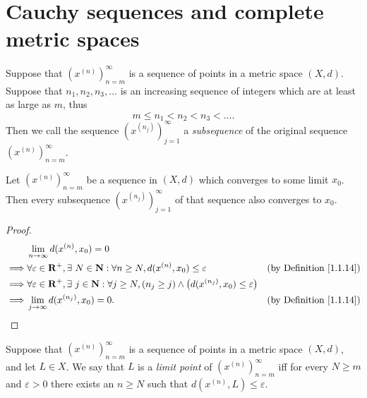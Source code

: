 \section{Cauchy sequences and complete metric spaces}\label{sec 1.4}

\begin{definition}[Subsequences]\label{1.4.1}
    Suppose that \((x^{(n)})_{n = m}^\infty\) is a sequence of points in a metric space \((X, d)\).
    Suppose that \(n_1, n_2, n_3, \dots\) is an increasing sequence of integers which are at least as large as \(m\), thus
    \[
        m \leq n_1 < n_2 < n_3 < \dots.
    \]
    Then we call the sequence \((x^{(n_j)})_{j = 1}^\infty\) a \emph{subsequence} of the original sequence \((x^{(n)})_{n = m}^\infty\).
\end{definition}

\setcounter{theorem}{2}
\begin{lemma}\label{1.4.3}
    Let \((x^{(n)})_{n = m}^\infty\) be a sequence in \((X, d)\) which converges to some limit \(x_0\).
    Then every subsequence \((x^{(n_j)})_{j = 1}^\infty\) of that sequence also converges to \(x_0\).
\end{lemma}

\begin{proof}
    \begin{align*}
                 & \lim_{n \to \infty} d(x^{(n)}, x_0) = 0                                                                                                                                   \\
        \implies & \forall \varepsilon \in \mathbf{R}^+, \exists\ N \in \mathbf{N} : \forall n \geq N, d(x^{(n)}, x_0) \leq \varepsilon                                & \text{(by Definition \ref{1.1.14})} \\
        \implies & \forall \varepsilon \in \mathbf{R}^+, \exists\ j \in \mathbf{N} : \forall j \geq N, (n_j \geq j) \land \big(d(x^{(n_j)}, x_0) \leq \varepsilon\big)                                       \\
        \implies & \lim_{j \to \infty} d(x^{(n_j)}, x_0) = 0.                                                                                          & \text{(by Definition \ref{1.1.14})}
    \end{align*}
\end{proof}

\begin{definition}\label{1.4.4}
    Suppose that \((x^{(n)})_{n = m}^\infty\) is a sequence of points in a metric space \((X, d)\), and let \(L \in X\).
    We say that \(L\) is a \emph{limit point} of \((x^{(n)})_{n = m}^\infty\) iff for every \(N \geq m\) and \(\varepsilon > 0\) there exists an \(n \geq N\) such that \(d(x^{(n)}, L) \leq \varepsilon\).
\end{definition}


